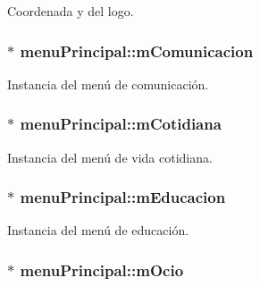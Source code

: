 Coordenada y del logo. 

\hypertarget{classmenu_principal_af820d04d0e35fa1f4c552af95d5e3036}{}
\subsubsection[{m\+Comunicacion}]{$\ast$ menu\+Principal\+::m\+Comunicacion\hspace{0.3cm}{\ttfamily [private]}}\label{classmenu_principal_af820d04d0e35fa1f4c552af95d5e3036}


Instancia del menú de comunicación. 

\hypertarget{classmenu_principal_a67ce856e4bf6566b0e2dc4f6c1471e19}{}
\subsubsection[{m\+Cotidiana}]{$\ast$ menu\+Principal\+::m\+Cotidiana\hspace{0.3cm}{\ttfamily [private]}}\label{classmenu_principal_a67ce856e4bf6566b0e2dc4f6c1471e19}


Instancia del menú de vida cotidiana. 

\hypertarget{classmenu_principal_a495c578e5fba7f2453f963e88c193b5d}{}
\subsubsection[{m\+Educacion}]{$\ast$ menu\+Principal\+::m\+Educacion\hspace{0.3cm}{\ttfamily [private]}}\label{classmenu_principal_a495c578e5fba7f2453f963e88c193b5d}


Instancia del menú de educación. 

\hypertarget{classmenu_principal_a8e372431b14d13de965f84dc0593e08a}{}
\subsubsection[{m\+Ocio}]{$\ast$ menu\+Principal\+::m\+Ocio\hspace{0.3cm}{\ttfamily [private]}}\label{classmenu_principal_a8e372431b14d13de965f84dc0593e08a}



